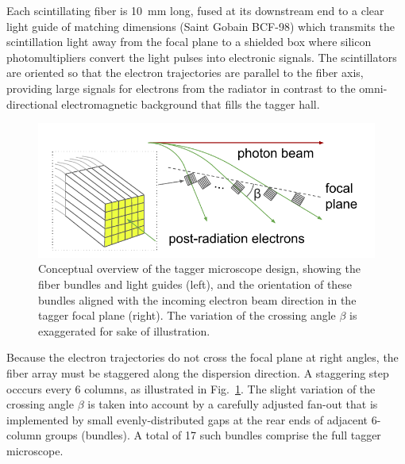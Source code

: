 Each scintillating fiber is 10~mm long, fused at its downstream end to
a clear light guide of matching dimensions (Saint Gobain BCF-98) which
transmits the scintillation light away from the focal plane to a shielded box where
silicon photomultipliers convert the light pulses into electronic signals. The
scintillators are oriented so that the electron trajectories are parallel to the
fiber axis, providing large signals for electrons from the radiator in contrast
to the omni-directional electromagnetic background that fills the tagger hall.

\begin{figure}[tbh]
\begin{center}
 \includegraphics[clip=true,width=0.95\linewidth]{figures/TAGM_conceptual.pdf}
\end{center}
\caption{
Conceptual overview of the tagger microscope design, showing the fiber bundles and
light guides (left), and the orientation of these bundles aligned with the incoming
electron beam direction in the tagger focal plane (right). The variation of the
crossing angle $\beta$ is exaggerated for sake of illustration.
        }
\label{fig:TAGM_conceptual}
\end{figure}

Because the electron trajectories do not cross the focal plane at right angles, the
fiber array must be staggered along the dispersion direction. A staggering step
occcurs every 6 columns, as illustrated in Fig.~\ref{fig:TAGM_conceptual}. The slight
variation of the crossing angle $\beta$ is taken into account by a carefully adjusted
fan-out that is implemented by small evenly-distributed gaps at the rear ends of 
adjacent 6-column groups (bundles). A total of 17 such bundles comprise the full
tagger microscope.

